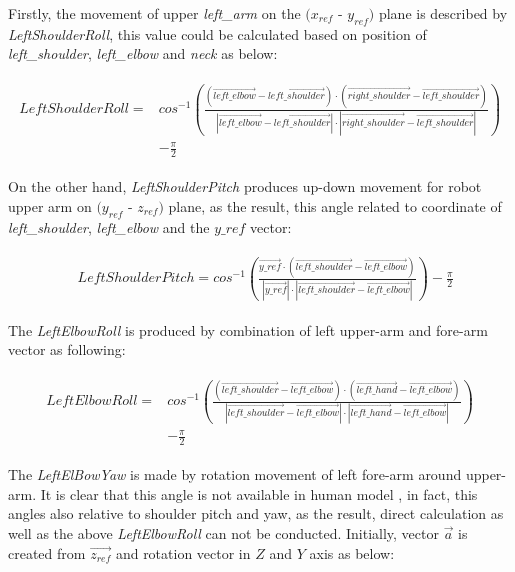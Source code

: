 Firstly, the movement of upper \textit{left\_arm} on the $(x_{ref}$ - $y_{ref})$ plane is described by \textit{LeftShoulderRoll}, this value could be calculated based on position of \textit{left\_shoulder}, \textit{left\_elbow} and \textit{neck} as below:

\begin{align}
\begin{split}
LeftShoulderRoll = & cos^{-1} \left( \frac{(\vec{left\_elbow} - \vec{left\_shoulder}) \cdot (\vec{right\_shoulder} -\vec{left\_shoulder})}{|\vec{left\_elbow} - \vec{left\_shoulder}| \cdot |\vec{right\_shoulder} -\vec{left\_shoulder}|} \right) \\ & - \frac{\pi}{2}
\end{split}
\end{align}

On the other hand, \textit{LeftShoulderPitch} produces up-down movement for robot upper arm on $(y_{ref}$ - $z_{ref})$ plane, as the result, this angle related to coordinate of \textit{left\_shoulder}, \textit{left\_elbow} and the $y\_ref$ vector:   
 
\begin{align}
\begin{split}
& LeftShoulderPitch = cos^{-1} \left( \frac{\vec{y\_ref} \cdot (\vec{left\_shoulder} -\vec{left\_elbow})}{|\vec{y\_ref}| \cdot |\vec{left\_shoulder} -\vec{left\_elbow}|} \right) - \frac{\pi}{2}
\end{split}
\end{align}

The \textit{LeftElbowRoll} is produced by combination of left upper-arm and fore-arm vector as following: 

\begin{align}
\begin{split}
LeftElbowRoll = & cos^{-1} \left( \frac{(\vec{left\_shoulder} - \vec{left\_elbow}) \cdot (\vec{left\_hand} -\vec{left\_elbow})}{|\vec{left\_shoulder} - \vec{left\_elbow}| \cdot |\vec{left\_hand} -\vec{left\_elbow}|} \right) \\ & - \frac{\pi}{2}
\end{split}
\end{align}

The \textit{LeftElBowYaw} is made by rotation movement of left fore-arm around upper-arm. It is clear that this angle is not available in human model \cite{zuher2012recognition} \cite{rosado2014using}, in fact, this angles also relative to shoulder pitch and yaw, as the result, direct calculation as well as the above \textit{LeftElbowRoll} can not be conducted. Initially, vector $\vec{a}$ is created from $\vec{z_{ref}}$ and rotation vector in $Z$ and $Y$ axis as below: 

